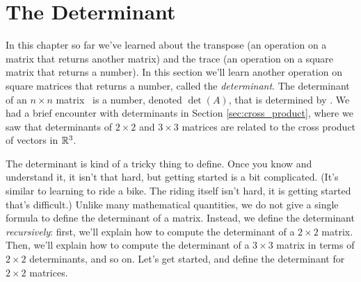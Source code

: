 \section{The Determinant}\label{sec:determinant_1}


In this chapter so far we've learned about the transpose (an operation on a matrix that returns another matrix) and the trace (an operation on a square matrix that returns a number). In this section we'll learn another operation on square matrices that returns a number, called the \textit{determinant}. The determinant of an $n\times n$ matrix \tta\ is a number, denoted $\det(A)$, that is determined by \tta.  We had a brief encounter with determinants in Section \ref{sec:cross_product}, where we saw that determinants of $2\times 2$ and $3\times 3$ matrices are related to the cross product of vectors in $\mathbb{R}^3$.

 The determinant is kind of a tricky thing to define. Once you know and understand it, it isn't that hard, but getting started is a bit complicated. (It's similar to learning to ride a bike. The riding itself isn't hard, it is getting started that's difficult.) Unlike many mathematical quantities, we do not give a single formula to define the determinant of a matrix. Instead, we define the determinant \textit{recursively}: first, we'll explain how to compute the determinant of a $2\times 2$ matrix. Then, we'll explain how to compute the determinant of a $3\times 3$ matrix in terms of $2\times 2$ determinants, and so on. Let's get started, and define the determinant for $2 \times 2$ matrices.


